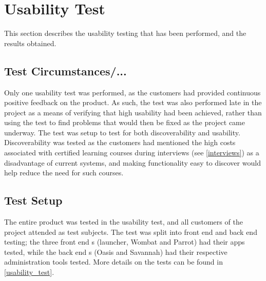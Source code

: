 \section{Usability Test}
This section describes the usability testing that has been performed, and the results obtained. 

\subsection{Test Circumstances/...}
Only one usability test was performed, as the customers had provided continuous positive feedback on the product. 
As such, the test was also performed late in the project as a means of verifying that high usability had been achieved, rather than using the test to find problems that would then be fixed as the project came underway. \newline
The test was setup to test for both discoverability and usability. 
Discoverability was tested as the customers had mentioned the high costs associated with certified learning courses during interviews (see \autoref{interviews}) as a disadvantage of current systems, and making functionality easy to discover would help reduce the need for such courses.

\subsection{Test Setup}
The entire \giraf[] product was tested in the usability test, and all customers of the project attended as test subjects. 
The test was split into front end and back end testing; the three front end \localgroup[]s (launcher, Wombat and Parrot) had their apps tested, while the back end \localgroup[]s (Oasis and Savannah) had their respective administration tools tested. 
More details on the tests can be found in \autoref{usability_test}.